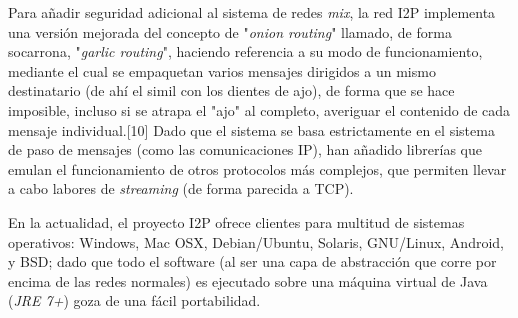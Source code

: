 \documentclass{article}
\begin{document}
Para añadir seguridad adicional al sistema de redes \textit{mix}, la red I2P implementa una versión mejorada del concepto de "\textit{onion routing}" llamado, de forma socarrona, "\textit{garlic routing}",
haciendo referencia a su modo de funcionamiento, mediante el cual se empaquetan varios mensajes dirigidos a un mismo destinatario (de ahí el simil con los dientes de ajo),
de forma que se hace imposible, incluso si se atrapa el "ajo" al completo, averiguar el contenido de cada mensaje individual.[10]
Dado que el sistema se basa estrictamente en el sistema de paso de mensajes (como las comunicaciones IP), han añadido librerías que emulan el funcionamiento de otros protocolos más complejos,
que permiten llevar a cabo labores de \textit{streaming} (de forma parecida a TCP).

En la actualidad, el proyecto I2P ofrece clientes para multitud de sistemas operativos: Windows, Mac OSX, Debian/Ubuntu, Solaris, GNU/Linux, Android, y BSD; dado que todo el software
(al ser una capa de abstracción que corre por encima de las redes normales) es ejecutado sobre una máquina virtual de Java (\textit{JRE 7+}) goza de una fácil portabilidad.
\end{document}
